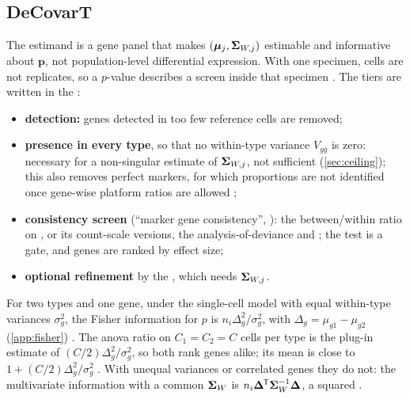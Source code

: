 \documentclass[11pt,a4paper]{article}
\begin{document}
\subsection{DeCovarT}\label{sec:decovart-genes}

The estimand is a gene panel that makes $(\bm{\mu}_j,\bm{\Sigma}_{W,j})$ estimable and informative about $\bm p$, not
population-level differential expression. With one specimen, cells are not replicates, so a $p$-value
describes a screen inside that specimen \parencite{zimmermanPracticalSolutionPseudoreplication2021,
squairConfrontingFalseDiscoveries2021}. The tiers are written in the
:
\begin{itemize}
  \item \textbf{detection:} genes detected in too few reference cells are removed;
  \item \textbf{presence in every type}, so that no within-type variance $V_{gg}$ is zero: necessary for a
        non-singular estimate of $\bm{\Sigma}_{W,j}$, not sufficient (\cref{sec:ceiling}); this also removes perfect
        markers, for which proportions are not identified once gene-wise platform ratios are allowed
        \parencite[p.~7]{xieStatisticalInferenceCell2026};
  \item \textbf{consistency screen} (\enquote{marker gene consistency},
        \textcite[p.~2]{wangBulkTissueCell2019}): the between/within ratio on
        , or its count-scale versions, the analysis-of-deviance
        and  \parencite{lundDetectingDifferentialExpression2012};
        the test is a gate, and genes are ranked by effect size;
  \item \textbf{optional refinement} by the , which
        needs $\bm{\Sigma}_{W,j}$.
\end{itemize}
For two types and one gene, under the single-cell model with equal within-type variances $\sigma_g^2$,
the Fisher information for $p$ is $n_i\Delta_g^2/\sigma_g^2$, with $\Delta_g=\mu_{g1}-\mu_{g2}$
(\cref{app:fisher}) . The \gls{anova} ratio on $C_1=C_2=C$ cells per type is the plug-in
estimate of $(C/2)\Delta_g^2/\sigma_g^2$, so both rank genes alike; its mean is close to
$1+(C/2)\Delta_g^2/\sigma_g^2$ . With unequal variances or correlated genes they do not: the
multivariate information with a common $\bm{\Sigma}_W$ is $n_i\bm\Delta^{\mkern-1.5mu\mathsf{T}}\bm{\Sigma}_W^{-1}\bm\Delta$, a squared
 .
\end{document}
